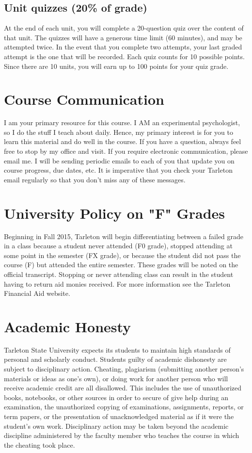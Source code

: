 \documentclass[10pt]{article}
\begin{document}
\subsection*{Unit quizzes (20\% of grade)}
\label{sec-5-2}
At the end of each unit, you will complete a 20-question quiz over the content of that unit.  The quizzes will have a generous time limit (60 minutes), and may be attempted twice.  In the event that you complete two attempts, your last graded attempt is the one that will be recorded.  Each quiz counts for 10 possible points.  Since there are 10 units, you will earn up to 100 points for your quiz grade.

\section*{Course Communication}
\label{sec-6}

I am your primary resource for this course. I AM an experimental psychologist, so I do the stuff I teach about daily. Hence, my primary interest is for you to learn this material and do well in the course. If you have a question, always feel free to stop by my office and visit.  If you require electronic communication, please email me.  I will be sending periodic emails to each of you that update you on course progress, due dates, etc.  It is imperative that you check your Tarleton email regularly so that you don't miss any of these messages.

\section*{University Policy on "F" Grades}
\label{sec-7}
Beginning in Fall 2015, Tarleton will begin differentiating between a failed grade in a class because a student never attended (F0 grade), stopped attending at some point in the semester (FX grade), or because the student did not pass the course (F) but attended the entire semester. These grades will be noted on the official transcript. Stopping or never attending class can result in the student having to return aid monies received.  For more information see the Tarleton Financial Aid website.

\section*{Academic Honesty}
\label{sec-8}

Tarleton State University expects its students to maintain high standards of personal and scholarly conduct. Students guilty of academic dishonesty are subject to disciplinary action. Cheating, plagiarism (submitting another person’s materials or ideas as one’s own), or doing work for another person who will receive academic credit are all disallowed. This includes the use of unauthorized books, notebooks, or other sources in order to secure of give help during an examination, the unauthorized copying of examinations, assignments, reports, or term papers, or the presentation of unacknowledged material as if it were the student’s own work. Disciplinary action may be taken beyond the academic discipline administered by the faculty member who teaches the course in which the cheating took place.
\end{document}
